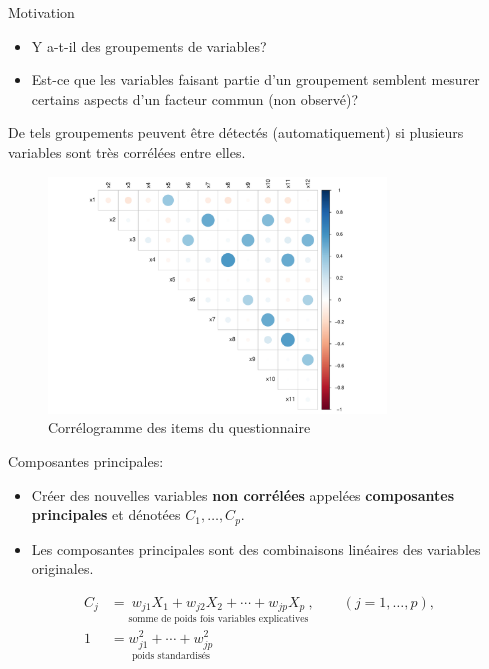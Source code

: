 \documentclass[
  ignorenonframetext,
]{beamer}
\providecommand{\tightlist}{%
  \setlength{\itemsep}{0pt}\setlength{\parskip}{0pt}}\usepackage{longtable,booktabs,array}
\begin{document}
\begin{frame}{Motivation}
\protect\hypertarget{motivation}{}
\begin{itemize}
\tightlist
\item
  Y a-t-il des groupements de variables?
\item
  Est-ce que les variables faisant partie d'un groupement semblent
  mesurer certains aspects d'un facteur commun (non observé)?
\end{itemize}

De tels groupements peuvent être détectés (automatiquement) si plusieurs
variables sont très corrélées entre elles.
\end{frame}

\begin{frame}
\begin{figure}

{\centering \includegraphics[width=0.8\textwidth,height=\textheight]{MATH60602-diapos3_files/figure-beamer/fig-correlogram-1.pdf}

}

\caption{\label{fig-correlogram}Corrélogramme des items du
questionnaire}

\end{figure}
\end{frame}

\begin{frame}{Composantes principales:}
\protect\hypertarget{composantes-principales}{}
\begin{itemize}
\tightlist
\item
  Créer des nouvelles variables \textbf{non corrélées} appelées
  \textbf{composantes principales} et dénotées \(C_1, \ldots, C_p\).
\item
  Les composantes principales sont des combinaisons linéaires des
  variables originales.
\end{itemize}

\begin{align*}
C_j &= \underset{\text{somme de poids fois variables explicatives}}{w_{j1} X_1 + w_{j2} X_2 + \cdots + w_{jp} X_p}, \qquad (j=1, \ldots, p),\\
1 &= \underset{\text{poids standardisés}}{w_{j1}^2 + \cdots + w_{jp}^2}
\end{align*}
\end{frame}
\end{document}
